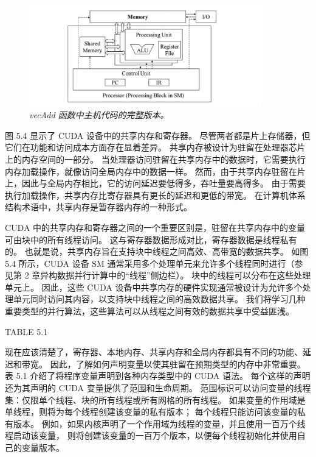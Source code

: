 \begin{figure}[H]
	\centering
	\includegraphics[width=0.9\textwidth]{figs/F5.4.png}
	\caption{\textit{\color{red} vecAdd 函数中主机代码的完整版本。}}
\end{figure}

图 5.4 显示了 CUDA 设备中的共享内存和寄存器。 尽管两者都是片上存储器，但它们在功能和访问成本方面存在显着差异。 
共享内存被设计为驻留在处理器芯片上的内存空间的一部分。 
当处理器访问驻留在共享内存中的数据时，它需要执行内存加载操作，就像访问全局内存中的数据一样。 
然而，由于共享内存驻留在片上，因此与全局内存相比，它的访问延迟要低得多，吞吐量要高得多。 
由于需要执行加载操作，共享内存比寄存器具有更长的延迟和更低的带宽。 
在计算机体系结构术语中，共享内存是暂存器内存的一种形式。

CUDA 中的共享内存和寄存器之间的一个重要区别是，驻留在共享内存中的变量可由块中的所有线程访问。 
这与寄存器数据形成对比，寄存器数据是线程私有的。 也就是说，共享内存旨在支持块中线程之间高效、高带宽的数据共享。 
如图 5.4 所示，CUDA 设备 SM 通常采用多个处理单元来允许多个线程同时进行（参见第 2 章异构数据并行计算中的“线程”侧边栏）。 
块中的线程可以分布在这些处理单元上。 
因此，这些 CUDA 设备中共享内存的硬件实现通常被设计为允许多个处理单元同时访问其内容，以支持块中线程之间的高效数据共享。 
我们将学习几种重要类型的并行算法，这些算法可以从线程之间有效的数据共享中受益匪浅。

{\color{red} TABLE 5.1}

现在应该清楚了，寄存器、本地内存、共享内存和全局内存都具有不同的功能、延迟和带宽。 
因此，了解如何声明变量以使其驻留在预期类型的内存中非常重要。 表 5.1 介绍了将程序变量声明到各种内存类型中的 CUDA 语法。 
每个这样的声明还为其声明的 CUDA 变量提供了范围和生命周期。 
范围标识可以访问变量的线程集：仅限单个线程、块的所有线程或所有网格的所有线程。 
如果变量的作用域是单线程，则将为每个线程创建该变量的私有版本； 每个线程只能访问该变量的私有版本。 
例如，如果内核声明了一个作用域为线程的变量，并且使用一百万个线程启动该变量，
则将创建该变量的一百万个版本，以便每个线程初始化并使用自己的变量版本。

